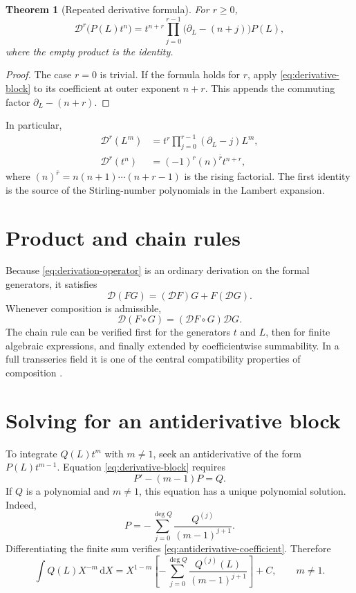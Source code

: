 \documentclass[11pt,oneside]{book}
\newtheorem{theorem}{Theorem}[chapter]
\theoremstyle{definition}
\theoremstyle{remark}
\newcommand{\dd}{\,\mathrm d}
\newcommand{\D}{\mathcal D}
\newcommand{\compose}{\mathbin{\circ}}
\begin{document}
\begin{theorem}[Repeated derivative formula]\label{thm:repeated-derivative}
For $r\ge0$,
\begin{equation}\label{eq:repeated-derivative}
 \D^r\bigl(P(L)t^n\bigr)
 =t^{n+r}
 \prod_{j=0}^{r-1}\bigl(\partial_L-(n+j)\bigr)P(L),
\end{equation}
where the empty product is the identity.
\end{theorem}
\begin{proof}
The case $r=0$ is trivial.  If the formula holds for $r$, apply
\eqref{eq:derivative-block} to its coefficient at outer exponent $n+r$.
This appends the commuting factor $\partial_L-(n+r)$.
\end{proof}

In particular,
\begin{align*}
 \D^r(L^m)
 &=t^r\prod_{j=0}^{r-1}(\partial_L-j)L^m,\\
 \D^r(t^n)
 &=(-1)^r(n)^{\overline r}t^{n+r},
\end{align*}
where $(n)^{\overline r}=n(n+1)\cdots(n+r-1)$ is the rising factorial.
The first identity is the source of the Stirling-number polynomials in the
Lambert expansion.

\section{Product and chain rules}
Because \eqref{eq:derivation-operator} is an ordinary derivation on the
formal generators, it satisfies
\[
 \D(FG)=(\D F)G+F(\D G).
\]
Whenever composition is admissible,
\begin{equation}\label{eq:formal-chain-rule}
 \D(F\compose G)=(\D F\compose G)\D G.
\end{equation}
The chain rule can be verified first for the generators $t$ and $L$, then for
finite algebraic expressions, and finally extended by coefficientwise
summability.  In a full transseries field it is one of the central
compatibility properties of composition \cite{EdgarComposition,vdHoeven2006}.

\section{Solving for an antiderivative block}
To integrate $Q(L)t^m$ with $m\ne1$, seek an antiderivative of the form
$P(L)t^{m-1}$.  Equation \eqref{eq:derivative-block} requires
\begin{equation}\label{eq:antiderivative-coefficient}
 P'-(m-1)P=Q.
\end{equation}
If $Q$ is a polynomial and $m\ne1$, this equation has a unique polynomial
solution.  Indeed,
\begin{equation}\label{eq:antiderivative-finite}
 P=-\sum_{j=0}^{\deg Q}
 \frac{Q^{(j)}}{(m-1)^{j+1}}.
\end{equation}
Differentiating the finite sum verifies \eqref{eq:antiderivative-coefficient}.
Therefore
\begin{equation}\label{eq:integral-block}
 \int Q(L)X^{-m}\dd X
 =X^{1-m}
 \left[-\sum_{j=0}^{\deg Q}\frac{Q^{(j)}(L)}{(m-1)^{j+1}}\right]+C,
 \qquad m\ne1.
\end{equation}
\end{document}
